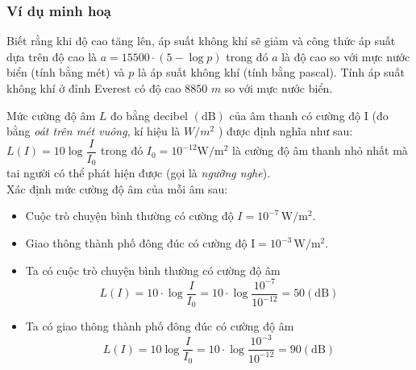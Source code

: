 \subsubsection{Ví dụ minh hoạ}
\begin{vd} %
	Biết rằng khi độ cao tăng lên, áp suất không khí sẽ giảm và công thức áp suất dựa trên độ cao là
	$a=15500 \cdot (5-\log p)$
	trong đó $a$ là độ cao so với mực nước biển (tính bằng mét) và $p$ là áp suất không khí (tính bằng pascal).
	Tính áp suất không khí ở đỉnh Everest có độ cao $8850$ $m$ so với mực nước biển.
\end{vd}
\begin{vd}  %
	Mức cường độ âm $L$ đo bằng decibel $(\mathrm{dB})$ của âm thanh có cường độ I (đo bằng \textit{oát trên mét vuông}, kí hiệu là $W / m^2$ ) được định nghĩa như sau:
	$L(I)=10 \log \dfrac{I}{I_0}$
	trong đó $I_0=10^{-12} \mathrm{W}/\mathrm{m}^2$ là cường độ âm thanh nhỏ nhất mà tai người có thể phát hiện được (gọi là \textit{ngưỡng nghe}).\\
	Xác định mức cường độ âm của mỗi âm sau:
	\begin{itemize}
		\item Cuộc trò chuyện bình thường có cường độ $I=10^{-7} \,\mathrm{W}/ \mathrm{m}^2$.
		\item Giao thông thành phố đông đúc có cường độ $\mathrm{I}=10^{-3} \, \mathrm{W}/\mathrm{m}^2$.
	\end{itemize}
	\loigiai
	{\begin{itemize}
			\item	Ta có cuộc trò chuyện bình thường có cường độ âm 
			\begin{equation*}
				L(I)=10 \cdot \log \dfrac{I}{{I_0}}=10 \cdot \log \dfrac{{10^{-7}}}{{10^{-12}}}=50{(\mathrm{dB})}
			\end{equation*}
			\item Ta có giao thông thành phố đông đúc có cường độ âm
			\begin{equation*} L(I)=10\log \dfrac{I}{{I_0}}=10 \cdot \log \dfrac{10^{-3}}{10^{-12}}=90{(\mathrm{dB})}
			\end{equation*}
	\end{itemize}}
\end{vd}
